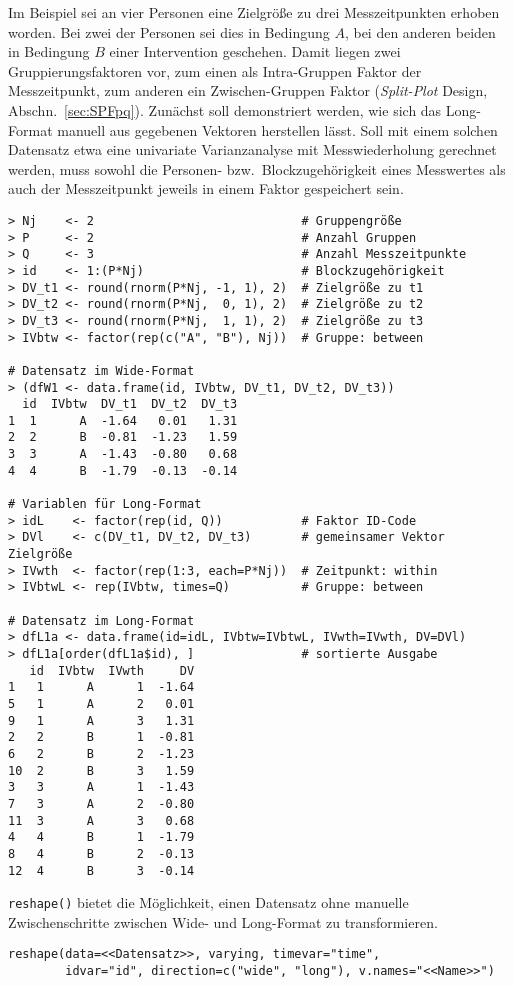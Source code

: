 Im Beispiel sei an vier Personen eine Zielgröße zu drei Messzeitpunkten erhoben worden. Bei zwei der Personen sei dies in Bedingung $A$, bei den anderen beiden in Bedingung $B$ einer Intervention geschehen. Damit liegen zwei Gruppierungsfaktoren vor, zum einen als Intra-Gruppen Faktor der Messzeitpunkt, zum anderen ein Zwischen-Gruppen Faktor (\emph{Split-Plot} Design, Abschn.\ \ref{sec:SPFpq}). Zunächst soll demonstriert werden, wie sich das Long-Format manuell aus gegebenen Vektoren herstellen lässt. Soll mit einem solchen Datensatz etwa eine univariate Varianzanalyse mit Messwiederholung gerechnet werden, muss sowohl die Personen- bzw.\ Blockzugehörigkeit eines Messwertes als auch der Messzeitpunkt jeweils in einem Faktor gespeichert sein.
\begin{lstlisting}
> Nj    <- 2                             # Gruppengröße
> P     <- 2                             # Anzahl Gruppen
> Q     <- 3                             # Anzahl Messzeitpunkte
> id    <- 1:(P*Nj)                      # Blockzugehörigkeit
> DV_t1 <- round(rnorm(P*Nj, -1, 1), 2)  # Zielgröße zu t1
> DV_t2 <- round(rnorm(P*Nj,  0, 1), 2)  # Zielgröße zu t2
> DV_t3 <- round(rnorm(P*Nj,  1, 1), 2)  # Zielgröße zu t3
> IVbtw <- factor(rep(c("A", "B"), Nj))  # Gruppe: between

# Datensatz im Wide-Format
> (dfW1 <- data.frame(id, IVbtw, DV_t1, DV_t2, DV_t3))
  id  IVbtw  DV_t1  DV_t2  DV_t3
1  1      A  -1.64   0.01   1.31
2  2      B  -0.81  -1.23   1.59
3  3      A  -1.43  -0.80   0.68
4  4      B  -1.79  -0.13  -0.14

# Variablen für Long-Format
> idL    <- factor(rep(id, Q))           # Faktor ID-Code
> DVl    <- c(DV_t1, DV_t2, DV_t3)       # gemeinsamer Vektor Zielgröße
> IVwth  <- factor(rep(1:3, each=P*Nj))  # Zeitpunkt: within
> IVbtwL <- rep(IVbtw, times=Q)          # Gruppe: between

# Datensatz im Long-Format
> dfL1a <- data.frame(id=idL, IVbtw=IVbtwL, IVwth=IVwth, DV=DVl)
> dfL1a[order(dfL1a$id), ]               # sortierte Ausgabe
   id  IVbtw  IVwth     DV
1   1      A      1  -1.64
5   1      A      2   0.01
9   1      A      3   1.31
2   2      B      1  -0.81
6   2      B      2  -1.23
10  2      B      3   1.59
3   3      A      1  -1.43
7   3      A      2  -0.80
11  3      A      3   0.68
4   4      B      1  -1.79
8   4      B      2  -0.13
12  4      B      3  -0.14
\end{lstlisting}

\lstinline!reshape()! bietet die Möglichkeit, einen Datensatz ohne manuelle Zwischenschritte zwischen Wide- und Long-Format zu transformieren.
\begin{lstlisting}
reshape(data=<<Datensatz>>, varying, timevar="time",
        idvar="id", direction=c("wide", "long"), v.names="<<Name>>")
\end{lstlisting}

